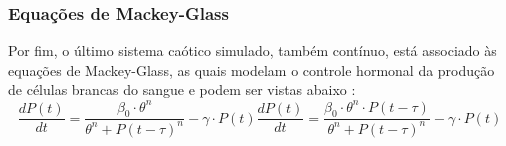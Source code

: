 \documentclass{article}
\begin{document}
\subsubsection{Equações de Mackey-Glass}

Por fim, o último sistema caótico simulado, também contínuo, está associado às equações de Mackey-Glass, as quais modelam o controle hormonal da produção de células brancas do sangue e podem ser vistas abaixo \cite{mackey1977oscillation}:
\begin{subequations}
\begin{equation}
\frac{dP(t)}{dt} = \frac{\beta_0\cdot \theta^n}{\theta^n + P(t - \tau)^n} - \gamma\cdot P(t)
\end{equation}
\begin{equation}\label{eq:mackey-glass-chaos}
\frac{dP(t)}{dt} = \frac{\beta_0\cdot \theta^n \cdot P(t - \tau)}{\theta^n + P(t - \tau)^n} - \gamma\cdot P(t)
\end{equation}
\end{subequations}
\end{document}
